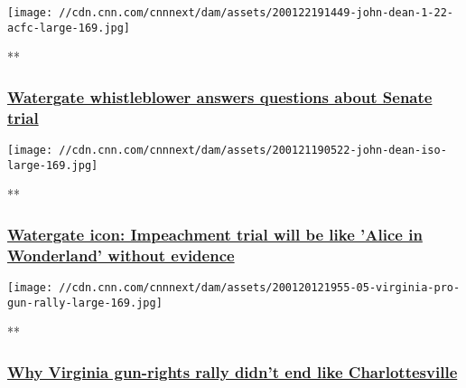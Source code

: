 \href{/videos/politics/2020/01/23/john-dean-answers-impeachment-trial-questions-acfc-full-episode-vpx.cnn/video/playlists/acfc-full-episodes/}{}

\texttt{[image: //cdn.cnn.com/cnnnext/dam/assets/200122191449-john-dean-1-22-acfc-large-169.jpg]}

**

\hypertarget{watergate-whistleblower-answers-questions-about-senate-trial}{%
\subsubsection{\texorpdfstring{\href{/videos/politics/2020/01/23/john-dean-answers-impeachment-trial-questions-acfc-full-episode-vpx.cnn/video/playlists/acfc-full-episodes/}{Watergate
whistleblower answers questions about Senate
trial}}{Watergate whistleblower answers questions about Senate trial}}\label{watergate-whistleblower-answers-questions-about-senate-trial}}

\href{/videos/politics/2020/01/21/john-dean-impeachment-trial-acfc-full-episode-vpx.cnn/video/playlists/acfc-full-episodes/}{}

\texttt{[image: //cdn.cnn.com/cnnnext/dam/assets/200121190522-john-dean-iso-large-169.jpg]}

**

\hypertarget{watergate-icon-impeachment-trial-will-be-like-alice-in-wonderland-without-evidence-}{%
\subsubsection{\texorpdfstring{\href{/videos/politics/2020/01/21/john-dean-impeachment-trial-acfc-full-episode-vpx.cnn/video/playlists/acfc-full-episodes/}{Watergate
icon: Impeachment trial will be like 'Alice in Wonderland' without
evidence
}}{Watergate icon: Impeachment trial will be like 'Alice in Wonderland' without evidence }}\label{watergate-icon-impeachment-trial-will-be-like-alice-in-wonderland-without-evidence-}}

\href{/videos/politics/2020/01/20/richmond-virginia-gun-rights-rally-acfc-full-episode-vpx.cnn/video/playlists/acfc-full-episodes/}{}

\texttt{[image: //cdn.cnn.com/cnnnext/dam/assets/200120121955-05-virginia-pro-gun-rally-large-169.jpg]}

**

\hypertarget{why-virginia-gun-rights-rally-didnt-end-like-charlottesville}{%
\subsubsection{\texorpdfstring{\href{/videos/politics/2020/01/20/richmond-virginia-gun-rights-rally-acfc-full-episode-vpx.cnn/video/playlists/acfc-full-episodes/}{Why
Virginia gun-rights rally didn't end like
Charlottesville}}{Why Virginia gun-rights rally didn't end like Charlottesville}}\label{why-virginia-gun-rights-rally-didnt-end-like-charlottesville}}

